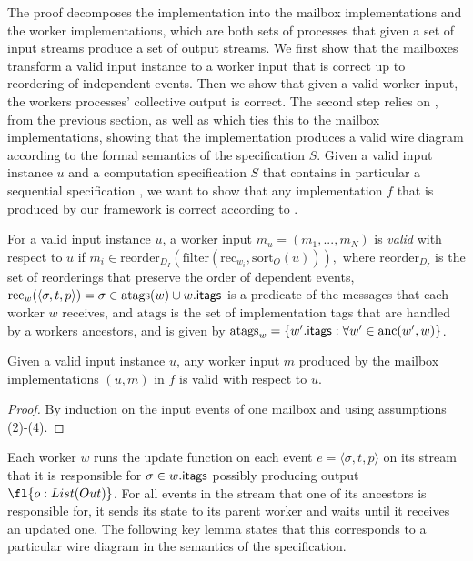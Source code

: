 The proof decomposes the implementation into the mailbox
implementations and the worker implementations, which are both sets of
processes that given a set of input streams produce a set of output
streams. We first show that the mailboxes transform a valid input
instance to a worker input that is correct up to reordering of
independent events. Then we show that given a valid worker input, the
workers processes' collective output is correct.
The second step relies on
,
from the previous section, as well as
which ties this to the mailbox implementations,
showing that the implementation produces a valid wire diagram according to the formal semantics of the specification $S$.
Given a valid input instance $u$ and a computation specification $S$ that contains
in particular a sequential specification , 
we want to show that any implementation $f$ that is produced by our framework is correct according to .

\begin{definition}
For a valid input instance $u$, a worker input $m_u = (m_1, ..., m_N)$
is \emph{valid} with respect to $u$ if $m_i \in \mathrm{reorder}_{D_I}
(\mathrm{filter}(\mathrm{rec}_{w_i}, \mathrm{sort}_O(u))),$ where
$\mathrm{reorder}_{D_I}$ is the set of reorderings that preserve the
order of dependent events,
  $\mathrm{rec}_w(\langle \sigma, t, p\rangle) = \sigma \in \mathrm{atags}(w) \cup {w}.{\mathsf{itags}}$
  is a predicate of the messages that each worker $w$ receives,
  and $\mathrm{atags}$ is the set of implementation tags that are handled by a workers ancestors, and is given by $\mathrm{atags}_w = \{ {w'}.{\mathsf{itags}} : \forall w' \in \mathrm{anc}(w', w)\}$.
\end{definition}

\begin{lemma}
\label{lemma:mailbox}
Given a valid input instance $u$, any worker input $m$ produced by
the mailbox implementations $(u, m)$ in $f$ is valid with respect to
$u$.
\end{lemma}
\begin{proof}
By induction on the input events of one mailbox and using assumptions
(2)-(4).
\end{proof}

Each worker $w$ runs the update function on each event $e = \langle
\sigma, t, p\rangle$ on its stream that it is responsible for $\sigma
\in {w}.{\mathsf{itags}}$ possibly producing output $\fl{o: List(Out)}$.
For all events in the stream that one of its
ancestors is responsible for, it sends its state to its parent worker 
and waits until it receives an updated one.
The following key lemma states that this corresponds to a particular
wire diagram in the semantics of the specification.

